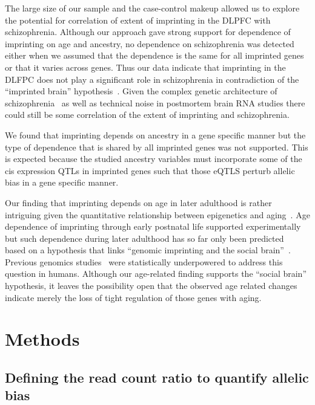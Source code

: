 \documentclass[letterpaper]{article}
\begin{document}
The large size of our sample and the case-control makeup allowed us to explore
the potential for correlation of extent of imprinting in the DLPFC with
schizophrenia.  Although our approach gave strong support for dependence of
imprinting on age and ancestry, no dependence on schizophrenia was detected
either when we assumed that the dependence is the same for all imprinted genes
or that it varies across genes.  Thus our data indicate that imprinting in the
DLFPC does not play a significant role in schizophrenia in contradiction of
the ``imprinted brain'' hypothesis~\cite{Crespi2008}.  Given the complex
genetic architecture of schizophrenia~\cite{Sullivan2012} as well as technical
noise in postmortem brain RNA studies there could still be some correlation of
the extent of imprinting and schizophrenia.

We found that imprinting depends on ancestry in a gene
specific manner but the type of dependence that is shared by all imprinted
genes was not supported.  This is expected because the studied
ancestry variables must incorporate some of the cis expression
QTLs in imprinted genes such that those eQTLS perturb allelic bias in a gene
specific manner.

Our finding that imprinting depends on age in later adulthood is rather
intriguing given the quantitative relationship between epigenetics and
aging~\cite{Horvath2013}.  Age dependence of imprinting through early
postnatal life supported experimentally~\cite{Perez2015} but such dependence
during later adulthood has so far only been predicted~\cite{Ubeda2012} based
on a hypothesis that links ``genomic imprinting and the social
brain''~\cite{Isles2006}.  Previous genomics studies~\cite{Baran2015} were
statistically underpowered to address this question in humans.  Although our
age-related finding supports the ``social brain'' hypothesis, it leaves the
possibility open that the observed age related changes indicate merely the
loss of tight regulation of those genes with aging.



\section*{Methods}

\subsection*{Defining the read count ratio to quantify allelic bias}
\end{document}
